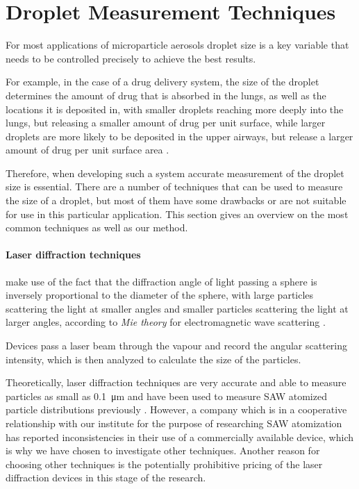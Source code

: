 \section{Droplet Measurement Techniques}
\label{sec:measurement_techniques}

For most applications of microparticle aerosols droplet size is a key variable that needs to be controlled precisely to achieve the best results.

For example, in the case of a drug delivery system, the size of the droplet determines the amount of drug that is absorbed in the lungs, as well as the locations it is deposited in, with smaller droplets reaching more deeply into the lungs, but releasing a smaller amount of drug per unit surface, while larger droplets are more likely to be deposited in the upper airways, but release a larger amount of drug per unit surface area \cite{labirisPulmonaryDrugDelivery2003}.

Therefore, when developing such a system accurate measurement of the droplet size is essential. There are a number of techniques that can be used to measure the size of a droplet, but most of them have some drawbacks or are not suitable for use in this particular application. 
This section gives an overview on the most common techniques as well as our method.

\paragraph{Laser diffraction techniques} make use of the fact that the diffraction angle of light passing a sphere is inversely proportional to the diameter of the sphere, with large particles scattering the light at smaller angles and smaller particles scattering the light at larger angles, according to \emph{Mie theory} for electromagnetic wave scattering \cite{drakeMieScattering1985,wriedtMieTheoryReview2012}.

Devices pass a laser beam through the vapour and record the angular scattering intensity, which is then analyzed to calculate the size of the particles. 

Theoretically, laser diffraction techniques are very accurate and able to measure particles as small as \SI{0.1}{\micro\meter} and have been used to measure SAW atomized particle distributions previously \cite{aishaqiInvestigationSAWAtomization2009}. 
However, a company which is in a cooperative relationship with our institute for the purpose of researching SAW atomization has reported inconsistencies in their use of a commercially available device, which is why we have chosen to investigate other techniques.
Another reason for choosing other techniques is the potentially prohibitive pricing of the laser diffraction devices in this stage of the research.

